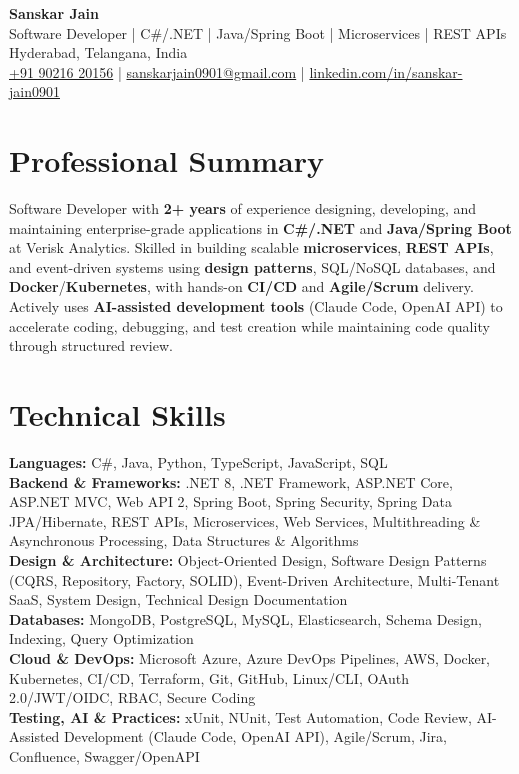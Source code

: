 \documentclass[a4paper,10pt]{article}
\begin{document}
\begin{center}
    {\LARGE \textbf{Sanskar Jain}} \\
    Software Developer \;|\; C\#/.NET \;|\; Java/Spring Boot \;|\; Microservices \;|\; REST APIs \\
    Hyderabad, Telangana, India \\
    \href{tel:+919021620156}{+91 90216 20156} \;|\;
    \href{mailto:sanskarjain0901@gmail.com}{sanskarjain0901@gmail.com} \;|\;
    \href{https://www.linkedin.com/in/sanskar-jain0901/}{linkedin.com/in/sanskar-jain0901}
\end{center}

\vspace{1pt}

\section*{Professional Summary}
Software Developer with \textbf{2+ years} of experience designing, developing, and maintaining enterprise-grade applications in \textbf{C\#/.NET} and \textbf{Java/Spring Boot} at Verisk Analytics.
Skilled in building scalable \textbf{microservices}, \textbf{REST APIs}, and event-driven systems using \textbf{design patterns}, SQL/NoSQL databases, and \textbf{Docker}/\textbf{Kubernetes}, with hands-on \textbf{CI/CD} and \textbf{Agile/Scrum} delivery.
Actively uses \textbf{AI-assisted development tools} (Claude Code, OpenAI API) to accelerate coding, debugging, and test creation while maintaining code quality through structured review.

\section*{Technical Skills}
\begin{sloppypar}
\noindent
\textbf{Languages:} C\#, Java, Python, TypeScript, JavaScript, SQL \\
\textbf{Backend \& Frameworks:} .NET 8, .NET Framework, ASP.NET Core, ASP.NET MVC, Web API 2, Spring Boot, Spring Security, Spring Data JPA/Hibernate, REST APIs, Microservices, Web Services, Multithreading \& Asynchronous Processing, Data Structures \& Algorithms \\
\textbf{Design \& Architecture:} Object-Oriented Design, Software Design Patterns (CQRS, Repository, Factory, SOLID), Event-Driven Architecture, Multi-Tenant SaaS, System Design, Technical Design Documentation \\
\textbf{Databases:} MongoDB, PostgreSQL, MySQL, Elasticsearch, Schema Design, Indexing, Query Optimization \\
\textbf{Cloud \& DevOps:} Microsoft Azure, Azure DevOps Pipelines, AWS, Docker, Kubernetes, CI/CD, Terraform, Git, GitHub, Linux/CLI, OAuth 2.0/JWT/OIDC, RBAC, Secure Coding \\
\textbf{Testing, AI \& Practices:} xUnit, NUnit, Test Automation, Code Review, AI-Assisted Development (Claude Code, OpenAI API), Agile/Scrum, Jira, Confluence, Swagger/OpenAPI
\end{sloppypar}
\end{document}
